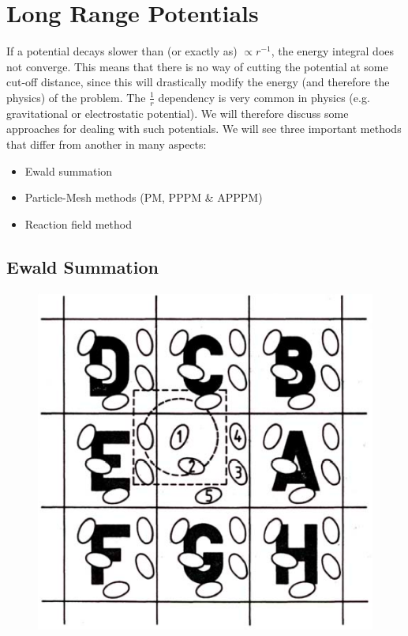 

\section{Long Range Potentials}

If a potential decays slower than (or exactly as) $\propto r^{-1}$, the energy integral does not converge. This means that there is no way of cutting the potential at some cut-off distance, since this will drastically modify the energy (and therefore the physics) of the problem. The $\frac{1}{r}$ dependency is very common in  physics (e.g. gravitational or electrostatic potential). We will therefore discuss some approaches for dealing with such potentials. We will see three important methods that differ from another in many aspects:

\begin{itemize}
\item Ewald summation
\item Particle-Mesh methods (PM, PPPM \& APPPM)
\item Reaction field method
\end{itemize}

\subsection{Ewald Summation}



\begin{figure}
  \vspace{-38pt}
  \centering
  \includegraphics[width=.4\textwidth]{pics/ewald}
  \label{fig:ewald}
\end{figure}

